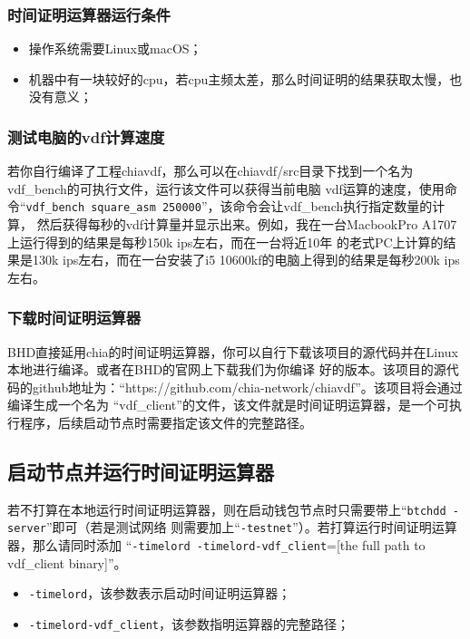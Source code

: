 \begin{flushleft}
\subsubsection{时间证明运算器运行条件}
\begin{itemize}
    \item 操作系统需要Linux或macOS；
    \item 机器中有一块较好的cpu，若cpu主频太差，那么时间证明的结果获取太慢，也没有意义；
\end{itemize}
\subsubsection{测试电脑的vdf计算速度}
\begin{flushleft}
    若你自行编译了工程chiavdf，那么可以在chiavdf/src目录下找到一个名为vdf\_bench的可执行文件，运行该文件可以获得当前电脑
    vdf运算的速度，使用命令``\texttt{vdf_bench square_asm 250000}''，该命令会让vdf\_bench执行指定数量的计算，
    然后获得每秒的vdf计算量并显示出来。例如，我在一台MacbookPro A1707上运行得到的结果是每秒150k ips左右，而在一台将近10年
    的老式PC上计算的结果是130k ips左右，而在一台安装了i5 10600kf的电脑上得到的结果是每秒200k ips左右。
\end{flushleft}
\subsubsection{下载时间证明运算器}
\begin{flushleft}
    BHD直接延用chia的时间证明运算器，你可以自行下载该项目的源代码并在Linux本地进行编译。或者在BHD的官网上下载我们为你编译
    好的版本。该项目的源代码的github地址为：``https://github.com/chia-network/chiavdf''。该项目将会通过编译生成一个名为
    ``vdf\_client''的文件，该文件就是时间证明运算器，是一个可执行程序，后续启动节点时需要指定该文件的完整路径。
\end{flushleft}
\subsection{启动节点并运行时间证明运算器}
\begin{flushleft}
    若不打算在本地运行时间证明运算器，则在启动钱包节点时只需要带上``\texttt{btchdd -server}''即可（若是测试网络
    则需要加上``\texttt{-testnet}''）。若打算运行时间证明运算器，那么请同时添加
    ``\texttt{-timelord -timelord-vdf_client}=[the full path to vdf\_client binary]''。
\end{flushleft}
\begin{itemize}
    \item \texttt{-timelord}，该参数表示启动时间证明运算器；
    \item \texttt{-timelord-vdf_client}，该参数指明运算器的完整路径；
\end{itemize}

\end{flushleft}
